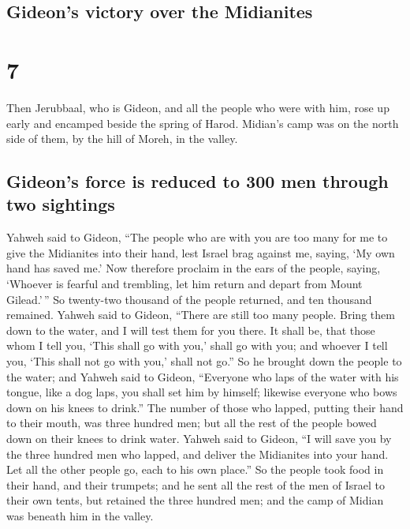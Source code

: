 \hypertarget{gideons-victory-over-the-midianites}{%
\subsection{Gideon's victory over the
Midianites}\label{gideons-victory-over-the-midianites}}

\hypertarget{section-6}{%
\section{7}\label{section-6}}

 Then Jerubbaal, who is Gideon, and all the people who
were with him, rose up early and encamped beside the spring of Harod.
Midian's camp was on the north side of them, by the hill of Moreh, in
the valley.

\hypertarget{gideons-force-is-reduced-to-300-men-through-two-sightings}{%
\subsection{Gideon's force is reduced to 300 men through two
sightings}\label{gideons-force-is-reduced-to-300-men-through-two-sightings}}

 Yahweh said to Gideon, ``The people who are with you are
too many for me to give the Midianites into their hand, lest Israel brag
against me, saying, `My own hand has saved me.'  Now
therefore proclaim in the ears of the people, saying, `Whoever is
fearful and trembling, let him return and depart from Mount Gilead.'\,''
So twenty-two thousand of the people returned, and ten thousand
remained.  Yahweh said to Gideon, ``There are still too
many people. Bring them down to the water, and I will test them for you
there. It shall be, that those whom I tell you, `This shall go with
you,' shall go with you; and whoever I tell you, `This shall not go with
you,' shall not go.''  So he brought down the people to
the water; and Yahweh said to Gideon, ``Everyone who laps of the water
with his tongue, like a dog laps, you shall set him by himself; likewise
everyone who bows down on his knees to drink.''  The
number of those who lapped, putting their hand to their mouth, was three
hundred men; but all the rest of the people bowed down on their knees to
drink water.  Yahweh said to Gideon, ``I will save you by
the three hundred men who lapped, and deliver the Midianites into your
hand. Let all the other people go, each to his own place.''
 So the people took food in their hand, and their
trumpets; and he sent all the rest of the men of Israel to their own
tents, but retained the three hundred men; and the camp of Midian was
beneath him in the valley.

